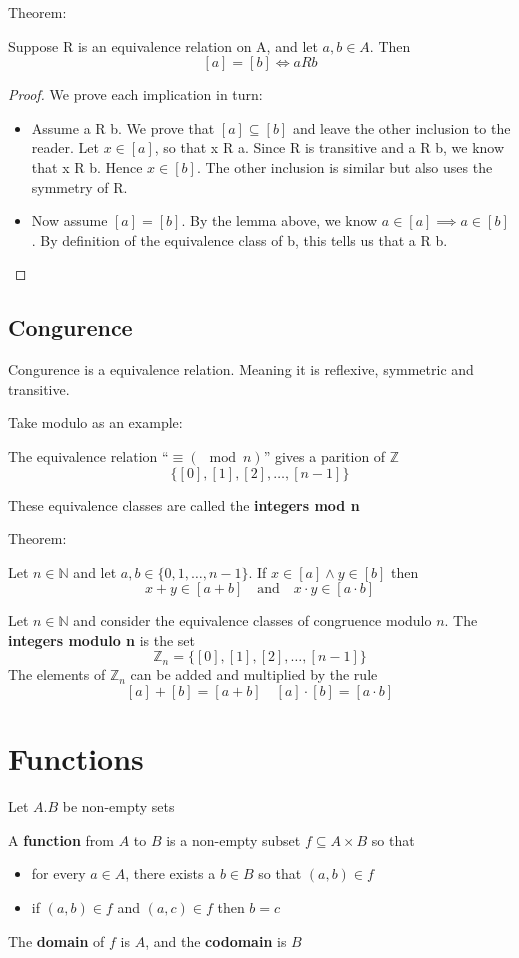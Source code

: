 \documentclass[letterpaper,12pt]{article}
\begin{document}
Theorem:

Suppose R is an equivalence relation on A, and let $a, b\in A$. Then
\[[a]=[b]\iff a R b\]

\begin{proof}
    We prove each implication in turn:
    \begin{itemize}
        \item Assume a R b. We prove that $[a]\subseteq[b]$ and leave the other inclusion to the reader. Let $x\in [a]$, so that x R a. Since R is transitive and a R b, we know that x R b. Hence $x\in [b]$. The other inclusion is similar but also uses the symmetry of R.
        \item Now assume $[a]=[b]$. By the lemma above, we know $a\in[a] \implies a\in [b]$. By definition of the equivalence class of b, this tells us that a R b.
    \end{itemize}
\end{proof}

\subsection{Congurence}
Congurence is a equivalence relation. Meaning it is reflexive, symmetric and transitive. 

Take modulo as an example:

The equivalence relation ``$\equiv (\mod n)$'' gives a parition of $\mathbb{Z}$
\[\{[0],[1],[2],\ldots,[n-1]\}\]

These equivalence classes are called the \textbf{integers mod n}

Theorem:

Let $n\in\mathbb{N}$ and let $a,b\in \{0,1,\ldots,n-1\}$. If $x\in[a]\land y\in [b]$ then 
\[x+y\in[a+b]\quad \text{and} \quad x\cdot y \in [a\cdot b]\]

Let $n\in \mathbb{N}$ and consider the equivalence classes of congruence modulo $n$. The \textbf{integers modulo n} is the set 
\[\mathbb{Z}_n=\{[0],[1],[2],\ldots,[n-1]\}\]
The elements of $\mathbb{Z}_n$ can be added and multiplied by the rule
\[[a]+[b]=[a+b]\quad [a]\cdot [b]=[a\cdot b]\]

\section{Functions}

Let $A.B$ be non-empty sets

A \textbf{function} from $A$ to $B$ is a non-empty subset $f\subseteq A\times B$ so that
\begin{itemize}
    \item for every $a\in A$, there exists a $b\in B$ so that $(a,b)\in f$
    \item if $(a,b)\in f$ and $(a,c) \in f$ then $b=c$
\end{itemize}
The \textbf{domain} of $f$ is $A$, and the \textbf{codomain} is $B$
\end{document}
